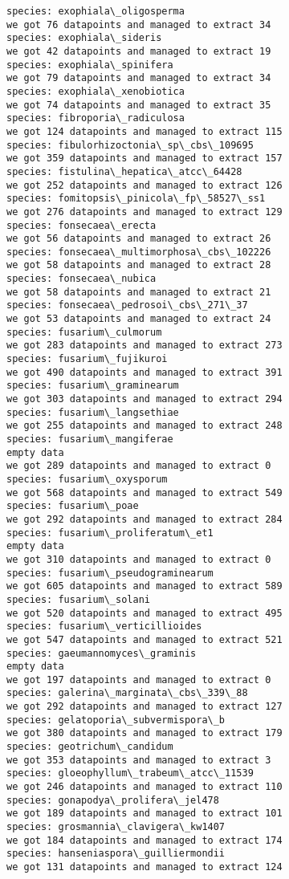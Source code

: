 \documentclass[11pt]{article}
\begin{document}
\begin{Verbatim}[commandchars=\\\{\}]
species: exophiala\_oligosperma
we got 76 datapoints and managed to extract 34
species: exophiala\_sideris
we got 42 datapoints and managed to extract 19
species: exophiala\_spinifera
we got 79 datapoints and managed to extract 34
species: exophiala\_xenobiotica
we got 74 datapoints and managed to extract 35
species: fibroporia\_radiculosa
we got 124 datapoints and managed to extract 115
species: fibulorhizoctonia\_sp\_cbs\_109695
we got 359 datapoints and managed to extract 157
species: fistulina\_hepatica\_atcc\_64428
we got 252 datapoints and managed to extract 126
species: fomitopsis\_pinicola\_fp\_58527\_ss1
we got 276 datapoints and managed to extract 129
species: fonsecaea\_erecta
we got 56 datapoints and managed to extract 26
species: fonsecaea\_multimorphosa\_cbs\_102226
we got 58 datapoints and managed to extract 28
species: fonsecaea\_nubica
we got 58 datapoints and managed to extract 21
species: fonsecaea\_pedrosoi\_cbs\_271\_37
we got 53 datapoints and managed to extract 24
species: fusarium\_culmorum
we got 283 datapoints and managed to extract 273
species: fusarium\_fujikuroi
we got 490 datapoints and managed to extract 391
species: fusarium\_graminearum
we got 303 datapoints and managed to extract 294
species: fusarium\_langsethiae
we got 255 datapoints and managed to extract 248
species: fusarium\_mangiferae
empty data
we got 289 datapoints and managed to extract 0
species: fusarium\_oxysporum
we got 568 datapoints and managed to extract 549
species: fusarium\_poae
we got 292 datapoints and managed to extract 284
species: fusarium\_proliferatum\_et1
empty data
we got 310 datapoints and managed to extract 0
species: fusarium\_pseudograminearum
we got 605 datapoints and managed to extract 589
species: fusarium\_solani
we got 520 datapoints and managed to extract 495
species: fusarium\_verticillioides
we got 547 datapoints and managed to extract 521
species: gaeumannomyces\_graminis
empty data
we got 197 datapoints and managed to extract 0
species: galerina\_marginata\_cbs\_339\_88
we got 292 datapoints and managed to extract 127
species: gelatoporia\_subvermispora\_b
we got 380 datapoints and managed to extract 179
species: geotrichum\_candidum
we got 353 datapoints and managed to extract 3
species: gloeophyllum\_trabeum\_atcc\_11539
we got 246 datapoints and managed to extract 110
species: gonapodya\_prolifera\_jel478
we got 189 datapoints and managed to extract 101
species: grosmannia\_clavigera\_kw1407
we got 184 datapoints and managed to extract 174
species: hanseniaspora\_guilliermondii
we got 131 datapoints and managed to extract 124

\end{Verbatim}
\end{document}
